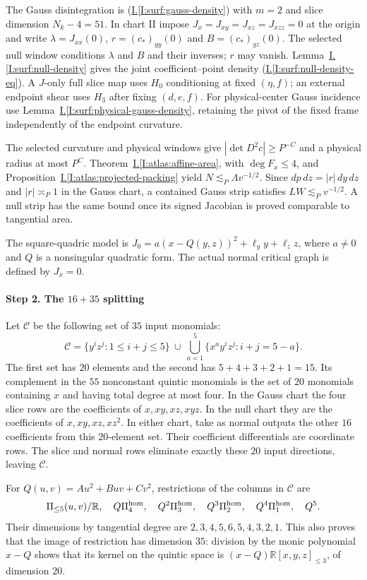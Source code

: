 \documentclass[11pt]{amsart}
\theoremstyle{definition}
\theoremstyle{remark}
\numberwithin{equation}{section}
\newcommand{\partIref}[1]{\hyperref[I:#1]{I.\ref*{I:#1}}}
\newcommand{\partIeqref}[1]{\textup{(\partIref{#1})}}
\begin{document}
The Gauss disintegration is \partIeqref{surf:gauss-density} with $m=2$ and slice dimension $N_k-4=51$. In chart II impose $J_x=J_{xy}=J_{xz}=J_{xzz}=0$ at the origin and write $\lambda=J_{xx}(0)$, $r=(c_*)_{yy}(0)$ and $B=(c_*)_{yz}(0)$. The selected null window conditions $\lambda$ and $B$ and their inverses; $r$ may vanish. Lemma~\partIref{surf:null-density} gives the joint coefficient--point density \partIeqref{surf:null-density-eq}. A $J$-only full slice map uses $H_0$ conditioning at fixed $(\eta,f)$; an external endpoint shear uses $H_3$ after fixing $(d,e,f)$. For physical-center Gauss incidence use Lemma~\partIref{surf:physical-gauss-density}, retaining the pivot of the fixed frame independently of the endpoint curvature.

The selected curvature and physical windows give $|\det D^2c|\ge P^{-C}$ and a physical radius at most $P^C$. Theorem~\partIref{atlas:affine-area}, with $\deg F_x\le4$, and Proposition~\partIref{atlas:projected-packing} yield $N\lesssim_P\Lambda v^{-1/2}$. Since $dp\,dz=|r|\,dy\,dz$ and $|r|\asymp_P1$ in the Gauss chart, a contained Gauss strip satisfies $LW\lesssim_Pv^{-1/2}$. A null strip has the same bound once its signed Jacobian is proved comparable to tangential area.

The square-quadric model is $J_0=a(x-Q(y,z))^2+\ell_y y+\ell_z z$, where $a\ne0$ and $Q$ is a nonsingular quadratic form. The actual normal critical graph is defined by $J_x=0$.

\paragraph{Step 2. The $16+35$ splitting}
Let $\mathcal C$ be the following set of $35$ input monomials:
\[
 \mathcal C=\{y^iz^j:1\le i+j\le5\}\ \cup\ \bigcup_{a=1}^{5}\{x^ay^iz^j:i+j=5-a\}.
\]
The first set has $20$ elements and the second has $5+4+3+2+1=15$. Its complement in the $55$ nonconstant quintic monomials is the set of $20$ monomials containing $x$ and having total degree at most four. In the Gauss chart the four slice rows are the coefficients of $x,xy,xz,xyz$. In the null chart they are the coefficients of $x,xy,xz,xz^2$. In either chart, take as normal outputs the other $16$ coefficients from this $20$-element set. Their coefficient differentials are coordinate rows. The slice and normal rows eliminate exactly these $20$ input directions, leaving $\mathcal C$.

For $Q(u,v)=Au^2+Buv+Cv^2$, restrictions of the columns in $\mathcal C$ are
\[
 \Pi_{\le5}(u,v)/\mathbb R,\quad Q\Pi_4^{\rm hom},\quad Q^2\Pi_3^{\rm hom},\quad Q^3\Pi_2^{\rm hom},\quad Q^4\Pi_1^{\rm hom},\quad Q^5.
\]
Their dimensions by tangential degree are $2,3,4,5,6,5,4,3,2,1$. This also proves that the image of restriction has dimension $35$: division by the monic polynomial $x-Q$ shows that its kernel on the quintic space is $(x-Q)\mathbb R[x,y,z]_{\le3}$, of dimension $20$.
\end{document}
